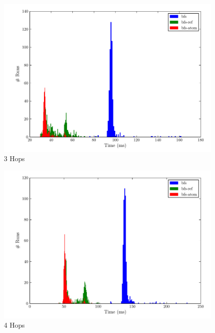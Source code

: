 \documentclass[12pt,letterpaper,oneside,notitlepage]{report}
\theoremstyle{definition}
\begin{document}
		\begin{figure}[!ht]
			\centering
			\includegraphics[scale=0.85]{3_hops}
			\caption{3 Hops}
			\label{fig:perf-3-hops}
		\end{figure}
		
		\begin{figure}[!ht]
			\centering
			\includegraphics[scale=0.85]{4_hops}
			\caption{4 Hops}
			\label{fig:perf-4-hops}
		\end{figure}
		
\end{document}
